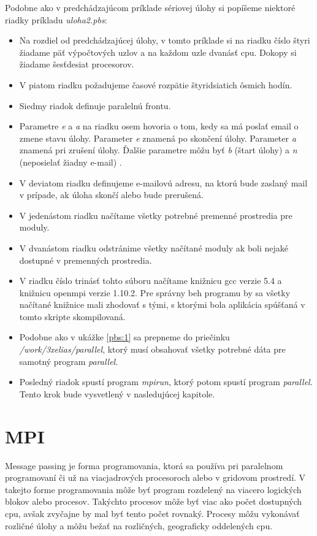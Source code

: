 Podobne ako v predchádzajúcom príklade sériovej úlohy si popíšeme niektoré riadky príkladu \textit{uloha2.pbs}:
\begin{itemize}
\item
  Na rozdiel od predchádzajúcej úlohy, v tomto príklade si na riadku číslo štyri žiadame päť výpočtových uzlov a na každom uzle dvanásť \acrshort{cpu}.
  Dokopy si žiadame šesťdesiat procesorov.
\item
  V piatom riadku požadujeme časové rozpätie štyridsiatich ôsmich hodín.
\item
  Siedmy riadok definuje paralelnú frontu.
\item
  Parametre \textit{e} a \textit{a} na riadku osem hovoria o tom, kedy sa má poslať email o zmene stavu úlohy.
  Parameter \textit{e} znamená po skončení úlohy.
  Parameter \textit{a} znamená pri zrušení úlohy.
  Ďalšie parametre môžu byť \textit{b} (štart úlohy) a \textit{n} (neposielať žiadny e-mail) \cite{cmd:qsub}.
\item
  V deviatom riadku definujeme e-mailovú adresu, na ktorú bude zaslaný mail v prípade, ak úloha skončí alebo bude prerušená.
\item
  V jedenástom riadku načítame všetky potrebné premenné prostredia pre moduly.
\item
  V dvanástom riadku odstránime všetky načítané moduly ak boli nejaké dostupné v premenných prostredia.
\item
  V riadku číslo trinásť tohto súboru načítame knižnicu gcc verzie 5.4 a knižnicu openmpi verzie 1.10.2.
  Pre správny beh programu by sa všetky načítané knižnice mali zhodovať s tými, s ktorými bola aplikácia spúšťaná v tomto skripte skompilovaná.
\item
  Podobne ako v ukážke \ref{pbs:1} sa prepneme do priečinku \textit{/work/3xelias/parallel}, ktorý musí obsahovať všetky potrebné dáta
  pre samotný program \textit{parallel}.
\item
  Posledný riadok spustí program \textit{mpirun}, ktorý potom spustí program \textit{parallel}. Tento krok bude vysvetlený v nasledujúcej kapitole.
\end{itemize}

\section{MPI}
Message passing je forma programovania, ktorá sa používa pri paralelnom programovaní či už na viacjadrových procesoroch alebo v gridovom prostredí.
V takejto forme programovania môže byť program rozdelený na viacero logických blokov alebo procesov.
Takýchto procesov môže byť viac ako počet dostupných \acrshort{cpu}, avšak zvyčajne by mal byť tento počet rovnaký.
Procesy môžu vykonávať rozličné úlohy a môžu bežať na rozličných, geograficky oddelených \acrshort{cpu}.

